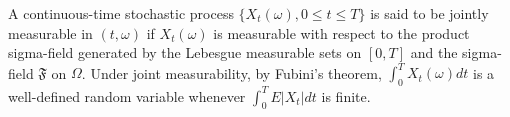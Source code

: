 A continuous-time stochastic process $\{X_t(\omega), 0 \leq t \leq T\}$ is said to be jointly measurable in $(t, \omega)$ if $X_t(\omega)$ is measurable with respect to the product sigma-field generated by the Lebesgue measurable sets on $[0, T]$ and the sigma-field $\mathfrak{F}$ on $\Omega$. Under joint measurability, by Fubini's theorem, $\int_0^T X_t(\omega) dt$ is a well-defined random variable whenever $\int_0^T E|X_t| dt$ is finite.
